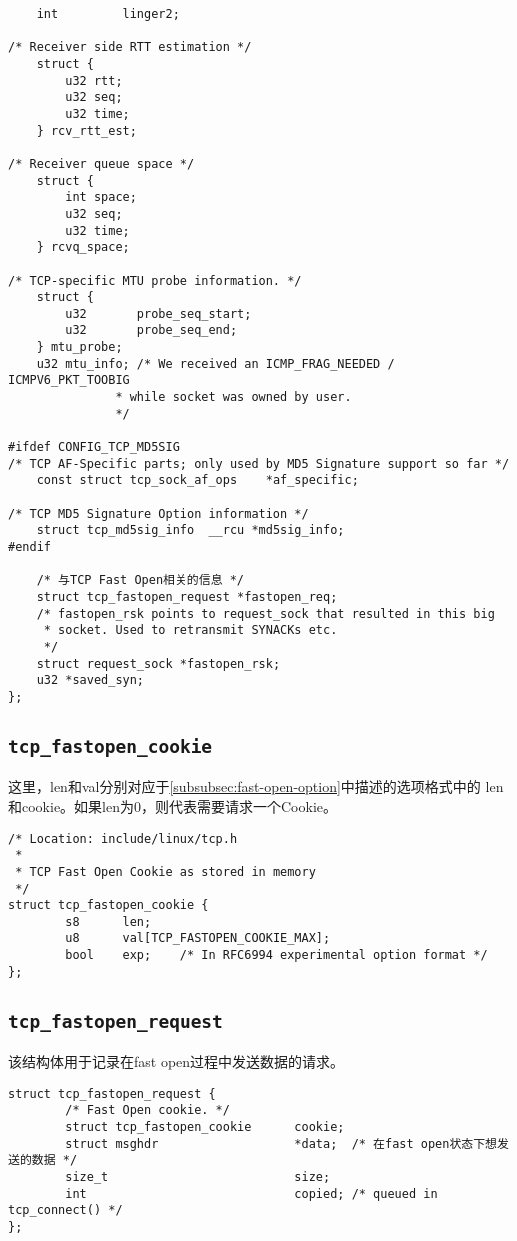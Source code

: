 \begin{verbatim}
    int         linger2;

/* Receiver side RTT estimation */
    struct {
        u32 rtt;
        u32 seq;
        u32 time;
    } rcv_rtt_est;

/* Receiver queue space */
    struct {
        int space;
        u32 seq;
        u32 time;
    } rcvq_space;

/* TCP-specific MTU probe information. */
    struct {
        u32       probe_seq_start;
        u32       probe_seq_end;
    } mtu_probe;
    u32 mtu_info; /* We received an ICMP_FRAG_NEEDED / ICMPV6_PKT_TOOBIG
               * while socket was owned by user.
               */

#ifdef CONFIG_TCP_MD5SIG
/* TCP AF-Specific parts; only used by MD5 Signature support so far */
    const struct tcp_sock_af_ops    *af_specific;

/* TCP MD5 Signature Option information */
    struct tcp_md5sig_info  __rcu *md5sig_info;
#endif

    /* 与TCP Fast Open相关的信息 */
    struct tcp_fastopen_request *fastopen_req;
    /* fastopen_rsk points to request_sock that resulted in this big
     * socket. Used to retransmit SYNACKs etc.
     */
    struct request_sock *fastopen_rsk;
    u32 *saved_syn;
};
\end{verbatim}
\subsection{\texttt{tcp_fastopen_cookie}}
这里，len和val分别对应于\ref{subsubsec:fast-open-option}中描述的选项格式中的
len和cookie。如果len为0，则代表需要请求一个Cookie。
\begin{verbatim}
/* Location: include/linux/tcp.h
 *
 * TCP Fast Open Cookie as stored in memory 
 */
struct tcp_fastopen_cookie {
        s8      len;
        u8      val[TCP_FASTOPEN_COOKIE_MAX];
        bool    exp;    /* In RFC6994 experimental option format */
};
\end{verbatim}
\subsection{\texttt{tcp_fastopen_request}}
该结构体用于记录在fast open过程中发送数据的请求。
\begin{verbatim}
struct tcp_fastopen_request {
        /* Fast Open cookie. */
        struct tcp_fastopen_cookie      cookie;
        struct msghdr                   *data;  /* 在fast open状态下想发送的数据 */
        size_t                          size;
        int                             copied; /* queued in tcp_connect() */
};
\end{verbatim}
